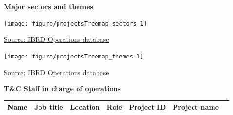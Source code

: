\documentclass{article}\usepackage[]{graphicx}\usepackage[]{color}
\begin{document}
 \newpage
\begin{minipage}[t]{0.99\textwidth}
\raggedright{\color{white!30!blue} \textbf{\large Major sectors and themes}}
     \vspace*{0.5cm}
     
  \begin{minipage}[c]{0.49\textwidth} %
    \vspace*{0.4cm}


{\centering \texttt{[image: figure/projectsTreemap\_sectors-1]} 

}



    \hspace*{0.3cm} \raggedright\footnotesize{\href{http://www.weforum.org/reports/global-competitiveness-report-2015-2016}{Source: IBRD Operations database}}
  \end{minipage}
  \begin{minipage}[c]{0.49\textwidth} %
    \vspace*{0.4cm}


{\centering \texttt{[image: figure/projectsTreemap\_themes-1]} 

}



  \raggedright{\footnotesize{\href{http://lpi.worldbank.org}{Source: IBRD Operations database}}}
  \end{minipage}
\end{minipage}  
 
\begin{minipage}[b]{0.99\textwidth}
  \vspace*{1cm}
  \raggedright{\color{white!30!blue} \textbf{\large T\&C Staff in charge of operations}}
  \vspace*{0.5cm}
     
{\small
\begin{tabular}{>{\raggedright}p{1.4in}>{\raggedright}p{1in}>{\raggedright}p{1in}>{\raggedright}p{1in}l>{\raggedright}p{1.5in}l}
 Name & Job title & Location & Role & Project ID & Project name &  \\ 
  \hline
\end{tabular}
}

     \vspace*{0.5cm}
\end{minipage}

\end{document}
